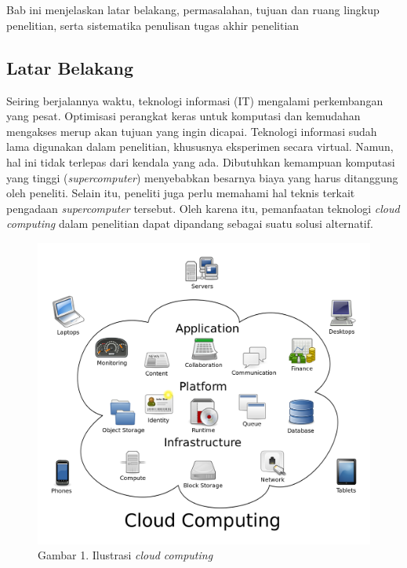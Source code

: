 
\chapter{\babSatu}
Bab ini menjelaskan latar belakang, permasalahan, tujuan dan ruang lingkup 
penelitian, serta sistematika penulisan tugas akhir penelitian 

\section{Latar Belakang}
Seiring berjalannya waktu, teknologi informasi (IT) mengalami perkembangan yang
pesat. Optimisasi perangkat keras untuk komputasi dan kemudahan mengakses merup
akan tujuan yang ingin dicapai. Teknologi informasi sudah lama digunakan dalam 
penelitian, khususnya eksperimen secara virtual. Namun, hal ini tidak terlepas
dari kendala yang ada. Dibutuhkan kemampuan komputasi yang tinggi (\textit{supercomputer}) 
menyebabkan besarnya biaya yang harus ditanggung oleh peneliti. Selain itu, 
peneliti juga perlu memahami hal teknis terkait pengadaan \textit{supercomputer} 
tersebut. Oleh karena itu, pemanfaatan teknologi \textit{cloud computing} dalam
penelitian dapat dipandang sebagai suatu solusi alternatif.
\begin{figure}
	\centering
	\includegraphics[scale = 0.1]{cloud_computing.png}
	\caption{Gambar 1. Ilustrasi \textit{cloud computing}}
\end{figure}
